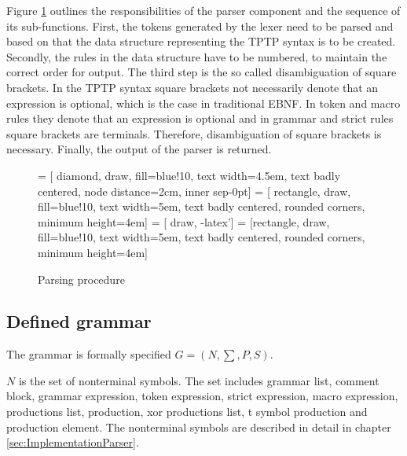 Figure \ref{fig:ConceptParserFlow} outlines the responsibilities of the parser component and the sequence of its sub-functions.
First, the tokens generated by the lexer need to be parsed and based on that the data structure representing the \ac{TPTP} syntax is to be created.
Secondly, the rules in the data structure have to be numbered, to maintain the correct order for output.
The third step is the so called disambiguation of square brackets.
In the \ac{TPTP} syntax square brackets not necessarily denote that an expression is optional, which is the case in traditional \ac{EBNF}.
In token and macro rules they denote that an expression is optional and in grammar and strict rules square brackets are terminals.
Therefore, disambiguation of square brackets is necessary.
Finally, the output of the parser is returned.
\begin{figure}[H]
 = [ diamond, draw, fill=blue!10, text width=4.5em, text badly centered, node distance=2cm, inner sep-0pt]  
 = [ rectangle, draw, fill=blue!10, text width=5em, text badly centered, rounded corners, minimum height=4em]  
 = [ draw, -latex']  
 = [rectangle, draw, fill=blue!10, text width=5em, text badly centered, rounded corners, minimum height=4em]  
\begin{center}
\end{center}
\caption{Parsing procedure}
\label{fig:ConceptParserFlow}
\end{figure}

\subsection{Defined grammar}\label{sec:ConceptParserGrammar}
The grammar is formally specified $G = (N,\sum,P,S)$.

$N$ is the set of nonterminal symbols. The set includes grammar list, comment block, grammar expression, token expression, strict expression, macro expression, productions list, production, xor productions list, t symbol production and production element. The nonterminal symbols are described in detail in chapter \ref{sec:ImplementationParser}.

